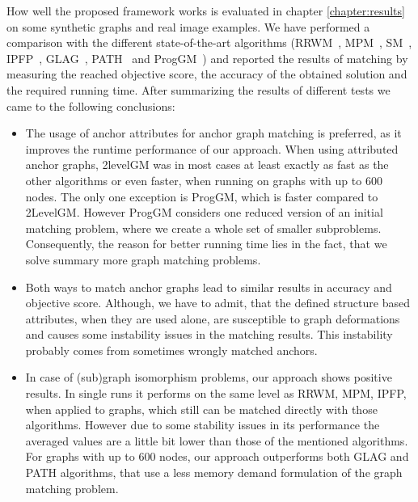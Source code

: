 How well the proposed framework works is evaluated in chapter \ref{chapter:results} on some synthetic graphs and real image examples. We have performed a comparison with the different state-of-the-art algorithms (RRWM~\cite{Cho2010_RRWM}, MPM~\cite{Cho2014_Haystack}, SM~\cite{Leordeanu2005_SM}, IPFP~\cite{Leordeanu2009_IPFP}, GLAG~\cite{Fiori2013_GLAG}, PATH~\cite{Zazlavskiy2008_PATH} and ProgGM~\cite{Cho2012_ProgressiveGM}) and reported the results of matching by measuring the reached objective score, the accuracy of the obtained solution and the required running time. After summarizing the results of different tests we came to the following conclusions:
\begin{itemize}
\item The usage of anchor attributes for anchor graph matching is preferred, as it improves the runtime performance of our approach. 
When using attributed anchor graphs, 2levelGM was in most cases at least exactly as fast as the other algorithms or even faster, when running on graphs with up to $600$ nodes. The only one exception is ProgGM, which is faster compared to 2LevelGM. However ProgGM considers one reduced version of an initial matching problem, where we create a whole set of smaller subproblems. Consequently, the reason for better running time lies in the fact, that we solve summary more graph matching problems.
\item Both ways to match anchor graphs lead to similar results in accuracy and objective score. Although, we have to admit, that the defined structure based attributes, when they are used alone, are susceptible to graph deformations and causes some instability issues in the matching results. This instability probably comes from sometimes wrongly matched anchors.
\item In case of (sub)graph isomorphism problems, our approach shows positive results. In single runs it performs on the same level as RRWM, MPM, IPFP, when applied to graphs, which still can be matched directly with those algorithms. However due to some stability issues in its performance the averaged values are a little bit lower than those of the mentioned algorithms. For graphs with up to $600$ nodes, our approach outperforms both GLAG and PATH algorithms, that use a less memory demand formulation of the graph matching problem.

\end{itemize}
